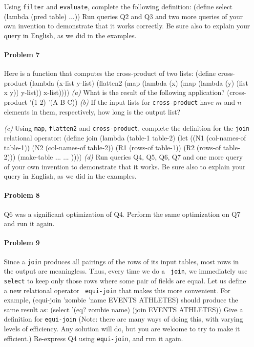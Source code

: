 Using {\tt filter} and {\tt evaluate}, complete the following definition:
 \beginlisp
(define select
  (lambda (pred table)
    ...))
 \endlisp
 Run queries Q2 and Q3 and two more queries of your own invention to
demonstrate that it works correctly.
Be sure also to explain your query in English, as we did in the examples.

\paragraph{Problem 7}

Here is a function that computes the cross-product of two lists:
 \beginlisp
(define cross-product
    (lambda (x-list y-list)
        (flatten2 (map (lambda (x)
                           (map (lambda (y) (list x y))
                                y-list))
                       x-list))))
 \endlisp
{\it (a)\/} What is the result of the following application?
 \beginlisp
(cross-product '(1 2) '(A B C))
 \endlisp
{\it (b)\/} If the input lists for {\tt cross-product} have $m$ and $n$ elements in
them, respectively, how long is the output list?

{\it (c)\/} Using {\tt map}, {\tt flatten2} and {\tt cross-product}, complete the
definition for the {\tt join} relational operator:
 \beginlisp
(define join
  (lambda (table-1 table-2)
    (let  ((N1 (col-names-of table-1))
           (N2 (col-names-of table-2))
           (R1 (rows-of table-1))
           (R2 (rows-of table-2)))
      (make-table
        ...
        ... ))))
 \endlisp
{\it (d)\/} Run queries Q4, Q5, Q6, Q7 and one more query of your own invention to
demonstrate that it works.  Be sure also to explain your query in English, as
we did in the examples.

\paragraph{Problem 8}

Q6 was a significant optimization of Q4.  Perform the same optimization on Q7
and run it again.

\paragraph{Problem 9}

Since a {\tt join} produces all pairings of the rows of its input tables,
most rows in the output are meaningless.  Thus, every time we do a {\tt
join}, we immediately use {\tt select} to keep only those rows where some
pair of fields are equal.  Let us define a new relational operator {\tt
equi-join} that makes this more convenient.  For example,
 \beginlisp
(equi-join 'zombie 'name EVENTS ATHLETES)
 \endlisp
should produce the same result as:
 \beginlisp
(select '(eq? zombie name)
    (join EVENTS ATHLETES))
 \endlisp
 Give a definition for {\tt equi-join} (Note: there are many ways of doing
this, with varying levels of efficiency.  Any solution will do, but you are
welcome to try to make it efficient.)  Re-express Q4 using {\tt equi-join},
and run it again.

